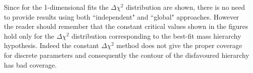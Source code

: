 Since for the 1-dimensional fits the $\Delta \chi^2$ distribution are shown,
there is no need to provide results using both ``independent" and ``global" approaches.
However the reader should remember that the constant critical values 
shown in the figures hold only for the $\Delta \chi^2$ distribution corresponding to the best-fit mass hierarchy hypothesis.
Indeed the constant $\Delta \chi^2$ method does not give the proper coverage for discrete parameters
and consequently the contour of the disfavoured hierarchy has bad coverage.





%
%
%


\newpage












